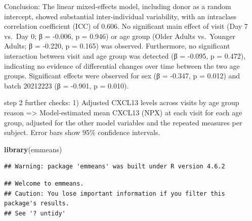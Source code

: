 \documentclass[
]{article}
\newenvironment{Shaded}{\begin{snugshade}}{\end{snugshade}}
\newcommand{\FunctionTok}[1]{\textcolor[rgb]{0.13,0.29,0.53}{\textbf{#1}}}
\newcommand{\NormalTok}[1]{#1}
\begin{document}
Conclusion: The linear mixed-effects model, including donor as a random
intercept, showed substantial inter-individual variability, with an
intraclass correlation coefficient (ICC) of 0.606. No significant main
effect of visit (Day 7 vs.~Day 0; β = -0.006, p = 0.946) or age group
(Older Adults vs.~Younger Adults; β = -0.220, p = 0.165) was observed.
Furthermore, no significant interaction between visit and age group was
detected (β = -0.095, p = 0.472), indicating no evidence of differential
changes over time between the two age groups. Significant effects were
observed for sex (β = -0.347, p = 0.012) and batch 20212223 (β = -0.901,
p = 0.010).

step 2 further checks: 1) Adjusted CXCL13 levels across visits by age
group reason =\textgreater{} Model-estimated mean CXCL13 (NPX) at each
visit for each age group, adjusted for the other model variables and the
repeated measures per subject. Error bars show 95\% confidence
intervals.

\begin{Shaded}
\begin{Highlighting}[]
\FunctionTok{library}\NormalTok{(emmeans)}
\end{Highlighting}
\end{Shaded}

\begin{verbatim}
## Warning: package 'emmeans' was built under R version 4.6.2
\end{verbatim}

\begin{verbatim}
## Welcome to emmeans.
## Caution: You lose important information if you filter this package's results.
## See '? untidy'
\end{verbatim}
\end{document}
